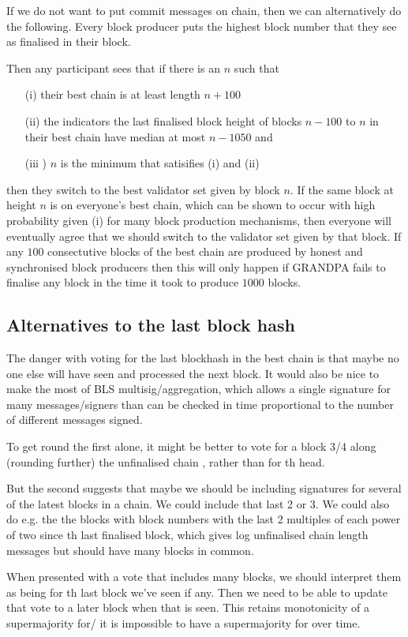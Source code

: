 \documentclass{article}
\begin{document}
If we do not want to put commit messages on chain, then we can alternatively do the following. Every block producer puts the highest block number that they see as finalised in their block.

Then any participant sees that if there is an $n$ such that
\begin{itemize}
\item[(i)] their best chain is at least length $n+100$
\item[(ii)] the indicators the last finalised block height of blocks $n-100$ to $n$ in their best chain have median at most $n-1050$ and
\item[(iii]) $n$ is the minimum that satisifies (i) and (ii)
\end{itemize}
then they switch to the best validator set given by block $n$. If the same block at height $n$ is on everyone's best chain, which can be shown to occur with high probability given (i) for many block production mechanisms, then everyone will eventually agree that we should switch to the validator set given by that block. If any $100$ consectutive blocks of the best chain are produced by honest and synchronised block producers then this will only happen if GRANDPA fails to finalise any block in the time it took to produce $1000$ blocks.

\subsection{Alternatives to the last block hash}

The danger with voting for the last blockhash in the best chain is that maybe no one else will have seen and processed the next block. It would also be nice to make the most of BLS multisig/aggregation, which allows a single signature for many messages/signers than can be checked in time proportional to the number of different messages signed. 

To get round the first alone, it might be better to vote for a block 3/4 along (rounding further) the unfinalised chain , rather than for th head.

But the second suggests that maybe we should be including signatures for several of the latest blocks in a chain. We could include that last 2 or 3. We could also do e.g. the the blocks with block numbers with the last 2 multiples of each power of two since th last finalised block, which gives log unfinalised chain length messages but should have many blocks in common.

When presented with a vote that includes many blocks, we should interpret them as being for th last block we've seen if any. Then we need to be able to update that vote to a later block when that is seen. This retains monotonicity of a supermajority for/ it is impossible to have a supermajority for over time.
\end{document}
